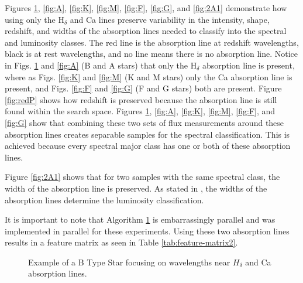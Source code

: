\documentclass[./AutomatedMK.tex]{subfiles}
\begin{document}
Figures \ref{fig:B}, \ref{fig:A}, \ref{fig:K}, \ref{fig:M}, \ref{fig:F}, \ref{fig:G}, and \ref{fig:2A1} demonstrate how using only the H$_\delta$ and Ca  lines preserve variability in the intensity, shape, redshift, and widths of the absorption lines needed to classify into the spectral and luminosity classes. The red line is the absorption line at redshift wavelengths, black is at rest wavelengths, and no line means there is no absorption line. Notice in Figs. \ref{fig:B} and \ref{fig:A} (B and A stars) that only the H$_\delta$ absorption line is present, where as Figs. \ref{fig:K} and \ref{fig:M} (K and M stars) only the Ca  absorption line is present, and Figs. \ref{fig:F} and \ref{fig:G} (F and G stars) both are present. Figure \ref{fig:redP} shows how redshift is preserved because the absorption line is still found within the search space. Figures \ref{fig:B}, \ref{fig:A}, \ref{fig:K}, \ref{fig:M}, \ref{fig:F}, and \ref{fig:G} show that combining these two sets of flux measurements around these absorption lines creates separable samples for the spectral classification. This is achieved because every spectral major class has one or both of these absorption lines. 

Figure \ref{fig:2A1} shows that for two samples with the same spectral class, the width of the absorption line is preserved. As stated in \citep{Gray}, the widths of the absorption lines determine the luminosity classification. 

It is important to note that Algorithm \hyperlink{alg:FS}{1} is embarrassingly parallel and was implemented in parallel for these experiments. Using these two absorption lines results in a feature matrix as seen in Table \ref{tab:feature-matrix2}.

\begin{figure}
\centering


\noindent 


\caption{Example of a B Type Star focusing on wavelengths near $H_\delta$ and Ca  absorption lines.}
\label{fig:B}
\end{figure}
\end{document}
